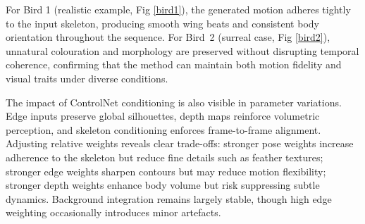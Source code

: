 \documentclass[final-report]{report-template}
\begin{document}
For Bird 1 (realistic example, Fig \ref{bird1}), the generated motion adheres tightly to the input skeleton, producing smooth wing beats and consistent body orientation throughout the sequence. 
For Bird~2 (surreal case, Fig \ref{bird2}), unnatural colouration and morphology are preserved without disrupting temporal coherence, confirming that the method can maintain both motion fidelity and visual traits under diverse conditions.  

The impact of ControlNet conditioning is also visible in parameter variations. 
Edge inputs preserve global silhouettes, depth maps reinforce volumetric perception, and skeleton conditioning enforces frame-to-frame alignment. 
Adjusting relative weights reveals clear trade-offs: stronger pose weights increase adherence to the skeleton but reduce fine details such as feather textures; stronger edge weights sharpen contours but may reduce motion flexibility; stronger depth weights enhance body volume but risk suppressing subtle dynamics. 
Background integration remains largely stable, though high edge weighting occasionally introduces minor artefacts.
\end{document}
